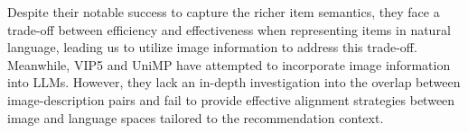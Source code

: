 \documentclass[sigconf]{acmart}
\begin{document}
Despite their notable success to capture the richer item semantics, they face a trade-off between efficiency and effectiveness when representing items in natural language, leading us to utilize image information to address this trade-off.
Meanwhile, VIP5 \cite{geng2023vip5} and UniMP \cite{wei2024towards} have attempted to incorporate image information into LLMs. However, they lack an in-depth investigation into the overlap between image-description pairs and fail to provide effective alignment strategies between image and language spaces tailored to the recommendation context.


\end{document}
